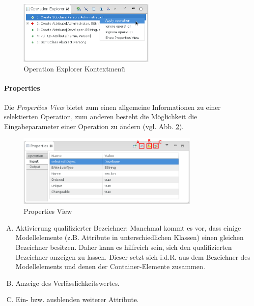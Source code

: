 \begin{figure}[H]
\centering
\includegraphics[width=0.6\textwidth]{patching/graphics/silift-tutorial_patching_operation_explorer_contextmenu.png}
\caption{Operation Explorer Kontextmenü}
\label{silift-tutorial_patching_operation_explorer_contextmenu}
\end{figure}

\paragraph{Properties}
Die \textit{Properties View} bietet zum einen allgemeine Informationen zu einer selektierten Operation, zum anderen besteht die Möglichkeit die Eingabeparameter einer Operation zu ändern (vgl. Abb. \ref{silift-tutorial_patching_properties_View}).

\begin{figure}[H]
\centering
\includegraphics[width=0.8\textwidth]{patching/graphics/silift-tutorial_patching_properties_view.png}
\caption{Properties View}
\label{silift-tutorial_patching_properties_View}
\end{figure}

\begin{enumerate}[(A)]
	\item Aktivierung qualifizierter Bezeichner: Manchmal kommt es vor, dass einige Modellelemente (z.B. Attribute in unterschiedlichen Klassen) einen gleichen Bezeichner besitzen. Daher kann es hilfreich sein, sich den qualifizierten Bezeichner anzeigen zu lassen. Dieser setzt sich i.d.R. aus dem Bezeichner des Modellelements und denen der Container-Elemente zusammen.
	\item Anzeige des Verlässlichkeitswertes.
	\item Ein- bzw. ausblenden weiterer Attribute.
\end{enumerate}

